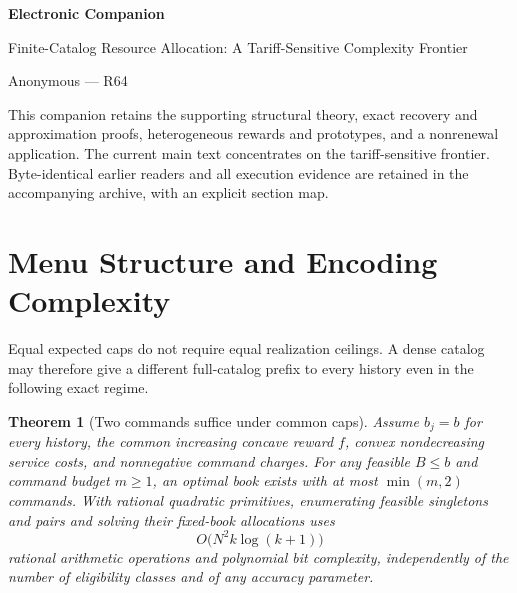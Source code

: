 \documentclass[11pt,letterpaper]{article}
\newtheorem{theorem}{Theorem}[section]
\theoremstyle{definition}\newtheorem{remark}[theorem]{Remark}
\begin{document}
\begin{center}{\Large\bfseries Electronic Companion}\par Finite-Catalog Resource Allocation: A Tariff-Sensitive Complexity Frontier\par Anonymous --- R64\end{center}
This companion retains the supporting structural theory, exact recovery and approximation proofs, heterogeneous rewards and prototypes, and a nonrenewal application. The current main text concentrates on the tariff-sensitive frontier. Byte-identical earlier readers and all execution evidence are retained in the accompanying archive, with an explicit section map.
\section{Menu Structure and Encoding Complexity}\label{sec:caps54}
Equal expected caps do not require equal realization ceilings. A dense catalog may therefore give a different full-catalog prefix to every history even in the following exact regime.
\begin{theorem}[Two commands suffice under common caps]\label{thm:twocommand54}
Assume $b_j=b$ for every history, the common increasing concave reward $f$, convex nondecreasing service costs, and nonnegative command charges. For any feasible $B\leq b$ and command budget $m\geq1$, an optimal book exists with at most $\min(m,2)$ commands. With rational quadratic primitives, enumerating feasible singletons and pairs and solving their fixed-book allocations uses
\[
 O\bigl(N^2k\log(k+1)\bigr)
\]
rational arithmetic operations and polynomial bit complexity, independently of the number of eligibility classes and of any accuracy parameter.
\end{theorem}
\end{document}
